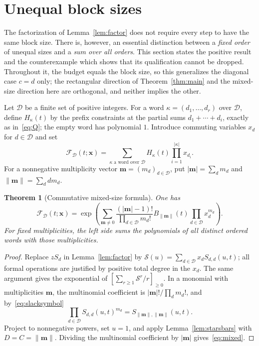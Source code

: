 \documentclass[11pt]{article}
\numberwithin{equation}{section}
\newtheorem{theorem}{Theorem}[section]
\theoremstyle{definition}
\newcommand{\pos}[1]{\left[#1\right]_{\geq0}}
\begin{document}
\section{Unequal block sizes}
\label{sec:mixed}

The factorization of Lemma~\ref{lem:factor} does not require every step to
have the same block size. There is, however, an essential distinction between
a \emph{fixed order} of unequal sizes and a \emph{sum over all orders}. This
section states the positive result and the counterexample which shows that its
qualification cannot be dropped. Throughout it, the budget equals the block
size, so this generalizes the diagonal case $c=d$ only; the rectangular
direction of Theorem~\ref{thm:main} and the mixed-size direction here are
orthogonal, and neither implies the other.

Let $\mathcal D$ be a finite set of positive integers. For a word
$\kappa=(d_1,\ldots,d_r)$ over $\mathcal D$, define $H_\kappa(t)$ by the
prefix constraints at the partial sums $d_1+\cdots+d_i$, exactly as
in~\eqref{eq:Q}; the empty word has polynomial $1$. Introduce commuting
variables $x_d$ for $d\in\mathcal D$ and set
\[
 \mathcal F_{\mathcal D}(t;\boldsymbol x)
 =\sum_{\kappa\text{ a word over }\mathcal D}
    H_\kappa(t)\prod_{i=1}^{|\kappa|}x_{d_i}.
\]
For a nonnegative multiplicity vector $\boldsymbol m=(m_d)_{d\in\mathcal D}$,
put $|\boldsymbol m|=\sum_dm_d$ and $\|\boldsymbol m\|=\sum_ddm_d$.

\begin{theorem}[Commutative mixed-size formula]
\label{thm:mixed}
One has
\begin{equation}
 \boxed{\mathcal F_{\mathcal D}(t;\boldsymbol x)
 =\exp\left(\sum_{\boldsymbol m\neq0}
   \frac{(|\boldsymbol m|-1)!}{\prod_{d\in\mathcal D}m_d!}
   B_{\|\boldsymbol m\|}(t)\prod_{d\in\mathcal D}x_d^{m_d}\right).}
 \label{eq:mixed}
\end{equation}
For fixed multiplicities, the left side sums the polynomials of all
\emph{distinct ordered words} with those multiplicities.
\end{theorem}
\begin{proof}
Replace $zS_d$ in Lemma~\ref{lem:factor} by
$\mathcal S(u)=\sum_{d\in\mathcal D}x_dS_{d,d}(u,t)$; all formal operations
are justified by positive total degree in the $x_d$. The same argument gives
the exponential of $\pos{\sum_{r\geq1}\mathcal S^r/r}$. In a monomial with
multiplicities $\boldsymbol m$, the multinomial coefficient is
$|\boldsymbol m|!/\prod_dm_d!$, and by~\eqref{eq:slacksymbol}
\[
 \prod_{d\in\mathcal D}S_{d,d}(u,t)^{m_d}
 =S_{\|\boldsymbol m\|,\|\boldsymbol m\|}(u,t).
\]
Project to nonnegative powers, set $u=1$, and apply
Lemma~\ref{lem:starsbars} with $D=C=\|\boldsymbol m\|$. Dividing the
multinomial coefficient by $|\boldsymbol m|$ gives~\eqref{eq:mixed}.
\end{proof}
\end{document}
